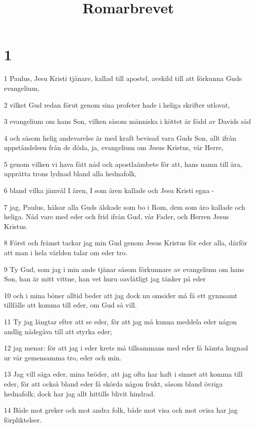 

\title{Romarbrevet}


\chapter{1}

\par 1 Paulus, Jesu Kristi tjänare, kallad till apostel, avskild till att förkunna Guds evangelium,
\par 2 vilket Gud redan förut genom sina profeter hade i heliga skrifter utlovat,
\par 3 evangelium om hans Son, vilken såsom människa i köttet är född av Davids säd
\par 4 och såsom helig andevarelse är med kraft bevisad vara Guds Son, allt ifrån uppståndelsen från de döda, ja, evangelium om Jesus Kristus, vår Herre,
\par 5 genom vilken vi hava fått nåd och apostlaämbete för att, hans namn till ära, upprätta trons lydnad bland alla hednafolk,
\par 6 bland vilka jämväl I ären, I som ären kallade och Jesu Kristi egna -
\par 7 jag, Paulus, hälsar alla Guds älskade som bo i Rom, dem som äro kallade och heliga. Nåd vare med eder och frid ifrån Gud, vår Fader, och Herren Jesus Kristus.
\par 8 Först och främst tackar jag min Gud genom Jesus Kristus för eder alla, därför att man i hela världen talar om eder tro.
\par 9 Ty Gud, som jag i min ande tjänar såsom förkunnare av evangelium om hans Son, han är mitt vittne, han vet huru oavlåtligt jag tänker på eder
\par 10 och i mina böner alltid beder att jag dock nu omsider må få ett gynnsamt tillfälle att komma till eder, om Gud så vill.
\par 11 Ty jag längtar efter att se eder, för att jag må kunna meddela eder någon andlig nådegåva till att styrka eder;
\par 12 jag menar: för att jag i eder krets må tillsammans med eder få hämta hugnad ur vår gemensamma tro, eder och min.
\par 13 Jag vill säga eder, mina bröder, att jag ofta har haft i sinnet att komma till eder, för att också bland eder få skörda någon frukt, såsom bland övriga hednafolk; dock har jag allt hittills blivit hindrad.
\par 14 Både mot greker och mot andra folk, både mot visa och mot ovisa har jag förpliktelser.

